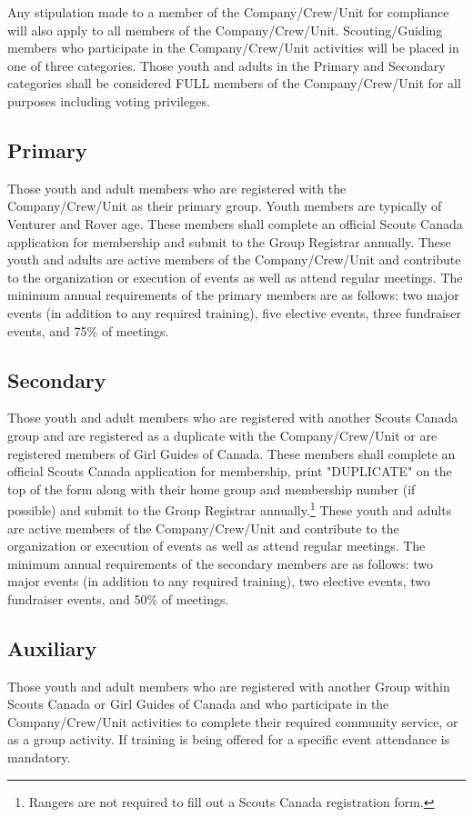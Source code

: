 Any stipulation made to a member of the Company/Crew/Unit for compliance will also apply to all members of the Company/Crew/Unit. 
Scouting/Guiding members who participate in the Company/Crew/Unit activities will be placed in one of three categories. Those youth and adults in the Primary and Secondary categories shall be considered FULL members of the Company/Crew/Unit for all purposes including voting privileges. 
\subsection{Primary}
Those youth and adult members who are registered with the Company/Crew/Unit as their primary group. Youth members are typically of Venturer and Rover age. These members shall complete an official Scouts Canada application for membership and submit to the Group Registrar annually. These youth and adults are active members of the Company/Crew/Unit and contribute to the organization or execution of events as well as attend regular meetings. The minimum annual requirements of the primary members are as follows: two major events (in addition to any required training), five elective events, three fundraiser events, and 75\% of meetings.
\subsection{Secondary}
Those youth and adult members who are registered with another Scouts Canada group and are registered as a duplicate with the Company/Crew/Unit or are registered members of Girl Guides of Canada. These members shall complete an official Scouts Canada application for membership, print "DUPLICATE" on the top of the form along with their home group and membership number (if possible) and submit to the Group Registrar annually.\footnote{Rangers are not required to fill out a Scouts Canada registration form.} These youth and adults are active members of the Company/Crew/Unit and contribute to the organization or execution of events as well as attend regular meetings. The minimum annual requirements of the secondary members are as follows: two major events (in addition to any required training), two elective events, two fundraiser events, and 50\% of meetings. 
\subsection{Auxiliary}
Those youth and adult members who are registered with another Group within Scouts Canada or Girl Guides of Canada and who participate in the Company/Crew/Unit activities to complete their required community service, or as a group activity. If training is being offered for a specific event attendance is mandatory.